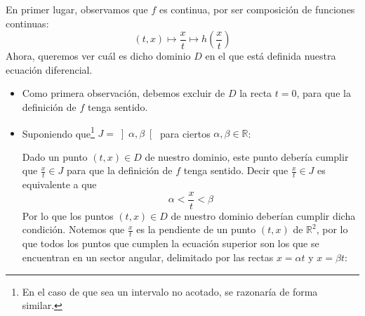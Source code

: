 \noindent
En primer lugar, observamos que $f$ es continua, por ser composición de funciones continuas:
\begin{equation*}
    (t,x) \longmapsto \dfrac{x}{t} \longmapsto h\left(\dfrac{x}{t}\right)
\end{equation*}
Ahora, queremos ver cuál es dicho dominio $D$ en el que está definida nuestra ecuación diferencial.
\begin{itemize}
    \item Como primera observación, debemos excluir de $D$ la recta $t=0$, para que la definición de $f$ tenga sentido.
    \item Suponiendo que\footnote{En el caso de que sea un intervalo no acotado, se razonaría de forma similar.} $J = \left]\alpha,\beta\right[$ para ciertos $\alpha,\beta\in \mathbb{R}$:

        Dado un punto $(t,x)\in D$ de nuestro dominio, este punto debería cumplir que $\frac{x}{t}\in J$ para que la definición de $f$ tenga sentido. Decir que $\frac{x}{t}\in J$ es equivalente a que
        \begin{equation*}
            \alpha < \dfrac{x}{t} < \beta
        \end{equation*}
        Por lo que los puntos $(t,x)\in D$ de nuestro dominio deberían cumplir dicha condición. Notemos que $\frac{x}{t}$ es la pendiente de un punto $(t,x)$ de $\mathbb{R}^2$, por lo que todos los puntos que cumplen la ecuación superior son los que se encuentran en un sector angular, delimitado por las rectas $x=\alpha t$ y $x=\beta t$:

\begin{figure}[H]
\centering    
{}
\end{figure}
\end{itemize}
